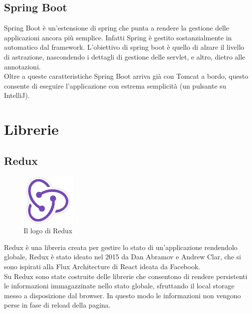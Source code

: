 \subsection{Spring Boot}
Spring Boot è un'estensione di spring che punta a rendere la gestione delle applicazioni ancora più semplice. Infatti Spring è gestito sostanzialmente in automatico dal framework. L'obiettivo di spring boot è quello di alzare il livello di astrazione, nascondendo i dettagli di gestione delle servlet, e altro, dietro alle annotazioni.
\\
Oltre a queste caratteristiche Spring Boot arriva già con Tomcat a bordo, questo consente di eseguire l'applicazione con estrema semplicità (un pulsante su IntelliJ).



\section{Librerie}

\subsection{Redux}
\begin{figure}[h]
    \centering
    \includegraphics[width=100px]{./images/redux_logo.jpg}
    \caption{Il logo di Redux}
    \label{fig:Redux}
\end{figure}
Redux è una libreria creata per gestire lo stato di un'applicazione rendendolo globale, Redux è stato ideato nel 2015 da Dan Abramov e Andrew Clar, che si sono ispirati alla Flux Architecture di React ideata da Facebook. \cite{ReduxHistory}
\\
Su Redux sono state costruite delle librerie che consentono di rendere persistenti le informazioni immagazzinate nello stato globale, sfruttando il local storage messo a disposizione dal browser. In questo modo le informazioni non vengono perse in fase di reload della pagina.



